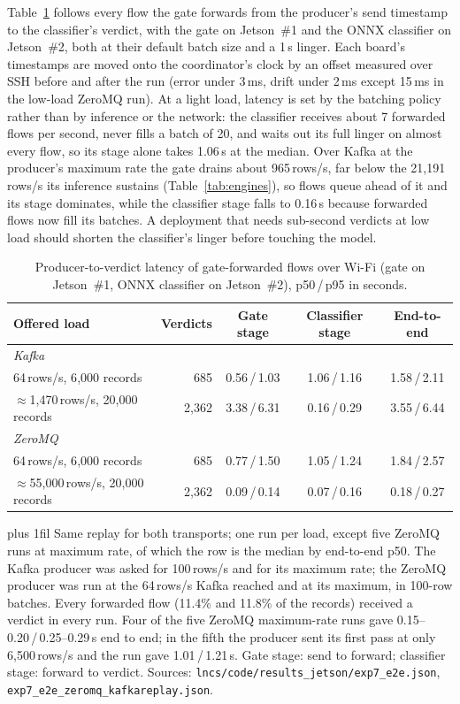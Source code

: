 \documentclass[runningheads]{llncs}
\newcommand{\tabnote}[1]{%
  \vspace{4pt}\par\noindent
  \begin{minipage}{\textwidth}%
    \footnotesize\parindent=0pt\leftskip=0pt\rightskip=0pt\parfillskip=0pt plus 1fil\relax
    #1%
  \end{minipage}}
\begin{document}
Table~\ref{tab:e2e} follows every flow the gate forwards from the producer's send timestamp to the classifier's verdict, with the gate on Jetson~\#1 and the ONNX classifier on Jetson~\#2, both at their default batch size and a 1\,s linger. Each board's timestamps are moved onto the coordinator's clock by an offset measured over SSH before and after the run (error under 3\,ms, drift under 2\,ms except 15\,ms in the low-load ZeroMQ run). At a light load, latency is set by the batching policy rather than by inference or the network: the classifier receives about 7 forwarded flows per second, never fills a batch of 20, and waits out its full linger on almost every flow, so its stage alone takes 1.06\,s at the median. Over Kafka at the producer's maximum rate the gate drains about 965\,rows/s, far below the 21{,}191\,rows/s its inference sustains (Table~\ref{tab:engines}), so flows queue ahead of it and its stage dominates, while the classifier stage falls to 0.16\,s because forwarded flows now fill its batches. A deployment that needs sub-second verdicts at low load should shorten the classifier's linger before touching the model.

\begin{table}[htbp]
  \caption{Producer-to-verdict latency of gate-forwarded flows over Wi-Fi (gate on Jetson~\#1, ONNX classifier on Jetson~\#2), p50\,/\,p95 in seconds.}
  \label{tab:e2e}
  \centering
  \small
  \setlength{\tabcolsep}{7pt}
  \begin{tabular}{l r c c c}
    \toprule
    Offered load & Verdicts & Gate stage & Classifier stage & End-to-end \\
    \midrule
    \multicolumn{5}{l}{\emph{Kafka}} \\
    64\,rows/s, 6{,}000 records         & 685     & 0.56\,/\,1.03 & 1.06\,/\,1.16 & 1.58\,/\,2.11 \\
    $\approx$1{,}470\,rows/s, 20{,}000 records & 2{,}362 & 3.38\,/\,6.31 & 0.16\,/\,0.29 & 3.55\,/\,6.44 \\
    \multicolumn{5}{l}{\emph{ZeroMQ}} \\
    64\,rows/s, 6{,}000 records         & 685     & 0.77\,/\,1.50 & 1.05\,/\,1.24 & 1.84\,/\,2.57 \\
    $\approx$55{,}000\,rows/s, 20{,}000 records & 2{,}362 & 0.09\,/\,0.14 & 0.07\,/\,0.16 & 0.18\,/\,0.27 \\
    \bottomrule
  \end{tabular}
  \tabnote{Same replay for both transports; one run per load, except five ZeroMQ runs at maximum rate, of which the row is the median by end-to-end p50. The Kafka producer was asked for 100\,rows/s and for its maximum rate; the ZeroMQ producer was run at the 64\,rows/s Kafka reached and at its maximum, in 100-row batches. Every forwarded flow (11.4\% and 11.8\% of the records) received a verdict in every run. Four of the five ZeroMQ maximum-rate runs gave 0.15--0.20\,/\,0.25--0.29\,s end to end; in the fifth the producer sent its first pass at only 6{,}500\,rows/s and the run gave 1.01\,/\,1.21\,s. Gate stage: send to forward; classifier stage: forward to verdict. Sources: \texttt{lncs/code/results\_jetson/exp7\_e2e.json}, \texttt{exp7\_e2e\_zeromq\_kafkareplay.json}.}
\end{table}
\end{document}
